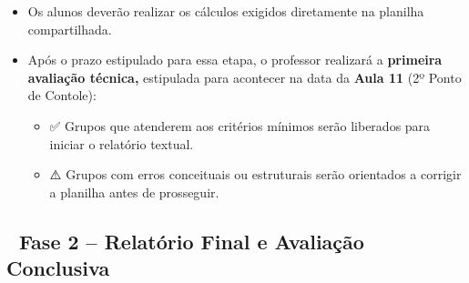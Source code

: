 \documentclass[
  a4paper,
]{book}
\providecommand{\tightlist}{%
  \setlength{\itemsep}{0pt}\setlength{\parskip}{0pt}}\usepackage{longtable,booktabs,array}
\begin{document}
\begin{enumerate}
  \begin{itemize}
  \item
    Os alunos deverão realizar os cálculos exigidos diretamente na
    planilha compartilhada.\\
  \item
    Após o prazo estipulado para essa etapa, o professor realizará a
    \textbf{primeira avaliação técnica,} estipulada para acontecer na
    data da \textbf{Aula 11} (2º Ponto de Contole):

    \begin{itemize}
    \tightlist
    \item
      ✅ Grupos que atenderem aos critérios mínimos serão liberados para
      iniciar o relatório textual.\\
    \item
      ⚠️ Grupos com erros conceituais ou estruturais serão orientados a
      corrigir a planilha antes de prosseguir.
    \end{itemize}
  \end{itemize}
\end{enumerate}

\subsection{📌 Fase 2 -- Relatório Final e Avaliação
Conclusiva}\label{fase-2-relatuxf3rio-final-e-avaliauxe7uxe3o-conclusiva}
\end{document}
